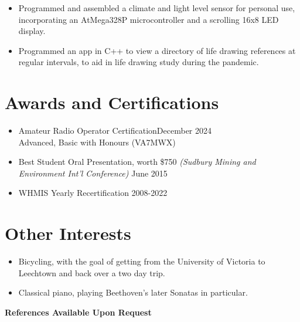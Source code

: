 \documentclass[line,margin]{res}
\begin{document}
\begin{resume}
\begin{itemize}
    \item Programmed and assembled a climate and light level sensor for personal use, incorporating an AtMega328P microcontroller and a scrolling 16x8 LED display.
    \item Programmed an app in C++ to view a directory of life drawing references at regular intervals, to aid in life drawing study during the pandemic.
\end{itemize}




\section{Awards and Certifications}
\begin{itemize} \itemsep -2pt
    \item Amateur Radio Operator Certification\hfill December 2024\\ Advanced, Basic with Honours (VA7MWX)
    \item Best Student Oral Presentation, worth \$750  {\sl (Sudbury Mining and Environment Int'l Conference)} \hfill June 2015
    \item WHMIS \hfill Yearly Recertification 2008-2022
\end{itemize}
\section{Other Interests}
\begin{itemize} \itemsep -2pt
    \item Bicycling, with the goal of getting from the University of Victoria to Leechtown and back over a two day trip.
    \item Classical piano, playing Beethoven’s later Sonatas in particular.
\end{itemize}
\textbf{References Available Upon Request}
\end{resume}
\end{document}
